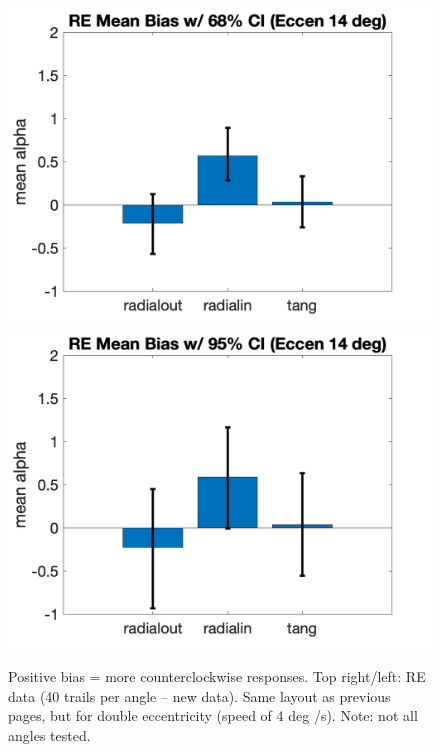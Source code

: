 \documentclass[11pt]{article} %
\begin{document}
\begin{figure}[H]
\includegraphics[scale=.2]{Images/MeanBiasError_68ci_RE_eccen14.png}
\includegraphics[scale=.2]{Images/MeanBiasError_95ci_RE_eccen14.png}
\caption{Positive bias = more counterclockwise responses. Top right/left: RE data (40 trails per angle -- new data).  Same layout as previous pages, but for double eccentricity (speed of 4 deg /s). Note: not all angles tested.}
\end{figure}

\newpage
\end{document}
